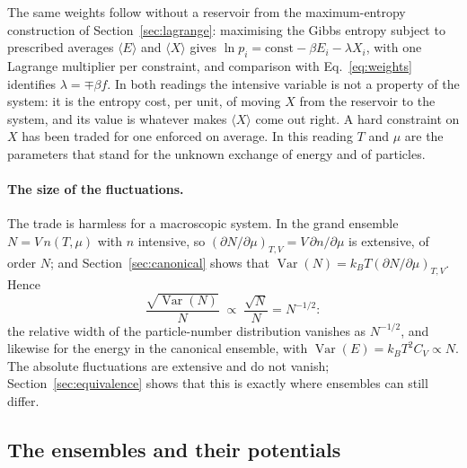 \documentclass[10pt,a4paper]{article}
\theoremstyle{remark}
\newcommand{\Var}{\operatorname{Var}}
\begin{document}
The same weights follow without a reservoir from the maximum-entropy
construction of Section~\ref{sec:lagrange}: maximising the Gibbs entropy
subject to prescribed averages $\langle E\rangle$ and $\langle X\rangle$ gives
$\ln p_i=\text{const}-\beta E_i-\lambda X_i$, with one Lagrange multiplier per
constraint, and comparison with Eq.~\eqref{eq:weights} identifies
$\lambda=\mp\beta f$. In both readings the intensive variable is not a
property of the system: it is the entropy cost, per unit, of moving $X$ from
the reservoir to the system, and its value is whatever makes
$\langle X\rangle$ come out right. A hard constraint on $X$ has been traded
for one enforced on average. In this
reading $T$ and $\mu$ are the parameters that stand for the unknown
exchange of energy and of particles.

\paragraph{The size of the fluctuations.} The trade is harmless for a
macroscopic system. In the grand ensemble $N=V\,n(T,\mu)$ with $n$ intensive,
so $(\partial N/\partial\mu)_{T,V}=V\,\partial n/\partial\mu$ is extensive,
of order $N$; and Section~\ref{sec:canonical} shows that
$\Var(N)=k_BT(\partial N/\partial\mu)_{T,V}$. Hence
\[
  \frac{\sqrt{\Var(N)}}{N}\;\propto\;\frac{\sqrt N}{N}=N^{-1/2} :
\]
the relative width of the particle-number distribution vanishes as
$N^{-1/2}$, and likewise for the energy in the canonical ensemble, with
$\Var(E)=k_BT^{2}C_V\propto N$. The absolute fluctuations are extensive and do
not vanish; Section~\ref{sec:equivalence} shows that this is exactly where
ensembles can still differ.

\subsection{The ensembles and their potentials}
\label{sec:partition}
\end{document}
